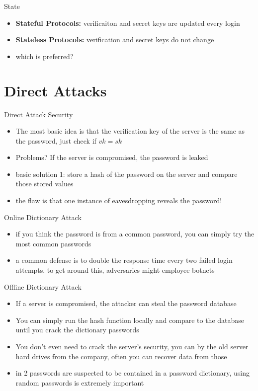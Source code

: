 \documentclass[handout]{beamer}
\begin{document}
\begin{frame}{State}
  \begin{itemize}
    \item \pause \textbf{Stateful Protocols:} verificaiton and secret keys are updated every login
    \item \pause \textbf{Stateless Protocols:} verification and secret keys do not change
    \item \pause which is preferred?
  \end{itemize} 
\end{frame}

\section{Direct Attacks}

\begin{frame}{Direct Attack Security}
  \begin{itemize}
    \item \pause The most basic idea is that the verification key of the server is the same as the password, just check if \(vk = sk\)
    \item \pause Problems? \pause If the server is compromised, the password is leaked
    \item \pause basic solution 1: store a hash of the password on the server and compare those stored values
    \item \pause the flaw is that one instance of eavesdropping reveals the password!
  \end{itemize}
\end{frame}

\begin{frame}{Online Dictionary Attack}
  \begin{itemize}
    \item \pause if you think the password is from a common password, you can simply try the most common passwords
    \item \pause a common defense is to double the response time every two failed login attempts, to get around this, adversaries might employee botnets
  \end{itemize} 
\end{frame}

\begin{frame}{Offline Dictionary Attack}
  \begin{itemize}
    \item \pause If a server is compromised, the attacker can steal the password database
    \item \pause You can simply run the hash function locally and compare to the database until you crack the dictionary passwords
    \item \pause You don't even need to crack the server's security, you can by the old server hard drives from the company, often you can recover data from those
    \item {} in 2 passwords are suspected to be contained in a password dictionary, using random passwords is extremely important
  \end{itemize} 
\end{frame}
\end{document}
